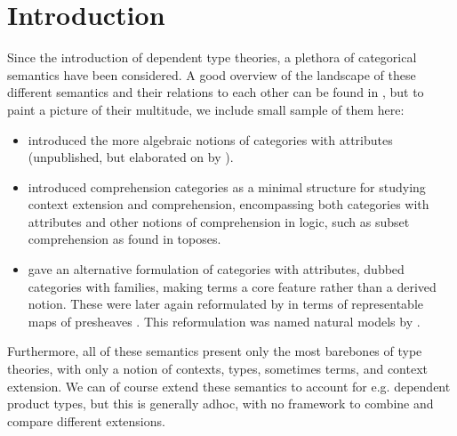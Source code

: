 \documentclass[../thesis.tex]{subfiles}
\begin{document}
\chapter{Introduction}\label{ch:intro}

Since the introduction of dependent type theories, a plethora of categorical semantics have been considered. A good overview of
the landscape of these different semantics and their relations to each other can be found in \cite{ahrens2024}, but to paint a
picture of their multitude, we include small sample of them here:
\begin{itemize}
  \item \textcite{cartmell1984} introduced the more algebraic notions of categories with attributes (unpublished, but
    elaborated on by \textcite{moggi1991,pitts2001}).
  \item \textcite{jacobs1993} introduced comprehension categories as a minimal structure for studying context extension
    and comprehension, encompassing both categories with attributes and other notions of comprehension in logic, such as
    subset comprehension as found in toposes.
  \item \textcite{dybjer1996} gave an alternative formulation of categories with attributes, dubbed categories with
    families, making terms a core feature rather than a derived notion. These were later again reformulated by
    \textcite{awodey2017,fiore2012} in terms of representable maps of presheaves . This reformulation
    was named natural models by \textcite{awodey2017}.
\end{itemize}
Furthermore, all of these semantics present only the most barebones of type theories, with only a notion of contexts, types,
sometimes terms, and context extension. We can of course extend these semantics to account for e.g. dependent product types,
but this is generally adhoc, with no framework to combine and compare different extensions.
\end{document}
